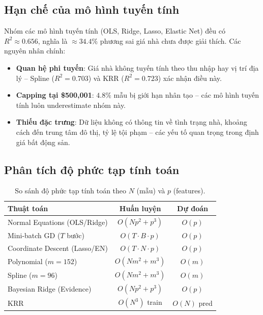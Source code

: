\documentclass[12pt,a4paper]{article}
\begin{document}
\subsection{Hạn chế của mô hình tuyến tính}

Nhóm các mô hình tuyến tính (OLS, Ridge, Lasso, Elastic Net) đều có
$R^2 \approx 0.656$, nghĩa là $\approx 34.4\%$ phương sai giá nhà
chưa được giải thích. Các nguyên nhân chính:
\begin{itemize}
  \item \textbf{Quan hệ phi tuyến}: Giá nhà không tuyến tính theo
        thu nhập hay vị trí địa lý -- Spline ($R^2 = 0.703$) và KRR
        ($R^2 = 0.723$) xác nhận điều này.
  \item \textbf{Capping tại \$500{,}001}: $4.8\%$ mẫu bị giới hạn
        nhân tạo -- các mô hình tuyến tính luôn underestimate nhóm này.
  \item \textbf{Thiếu đặc trưng}: Dữ liệu không có thông tin về
        tình trạng nhà, khoảng cách đến trung tâm đô thị, tỷ lệ tội
        phạm -- các yếu tố quan trọng trong định giá bất động sản.
\end{itemize}

\subsection{Phân tích độ phức tạp tính toán}

\begin{table}[H]
  \centering
  \caption{So sánh độ phức tạp tính toán theo $N$ (mẫu) và $p$ (features).}
  \label{tab:complexity_final}
  \begin{tabular}{lcc}
    \toprule
    \textbf{Thuật toán} & \textbf{Huấn luyện} & \textbf{Dự đoán} \\
    \midrule
    Normal Equations (OLS/Ridge) & $O(Np^2 + p^3)$       & $O(p)$      \\
    Mini-batch GD ($T$ bước)     & $O(T \cdot B \cdot p)$ & $O(p)$      \\
    Coordinate Descent (Lasso/EN)& $O(T \cdot N \cdot p)$ & $O(p)$      \\
    Polynomial ($m=152$)         & $O(Nm^2 + m^3)$       & $O(m)$      \\
    Spline ($m=96$)              & $O(Nm^2 + m^3)$       & $O(m)$      \\
    Bayesian Ridge (Evidence)    & $O(Np^2 + p^3)$       & $O(p)$      \\
    KRR                          & $O(N^3)$ train        & $O(N)$ pred \\
    \bottomrule
  \end{tabular}
\end{table}
\end{document}
